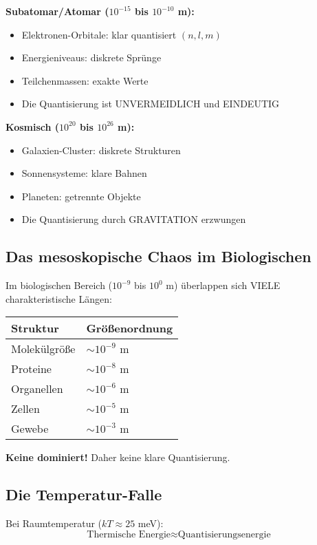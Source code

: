 \documentclass[12pt,a4paper]{article}
\begin{document}
	\textbf{Subatomar/Atomar ($10^{-15}$ bis $10^{-10}$ m):}
	\begin{itemize}
		\item Elektronen-Orbitale: klar quantisiert $(n, l, m)$
		\item Energieniveaus: diskrete Sprünge
		\item Teilchenmassen: exakte Werte
		\item Die Quantisierung ist UNVERMEIDLICH und EINDEUTIG
	\end{itemize}
	
	\textbf{Kosmisch ($10^{20}$ bis $10^{26}$ m):}
	\begin{itemize}
		\item Galaxien-Cluster: diskrete Strukturen
		\item Sonnensysteme: klare Bahnen
		\item Planeten: getrennte Objekte
		\item Die Quantisierung durch GRAVITATION erzwungen
	\end{itemize}
	
	\subsection{Das mesoskopische Chaos im Biologischen}
	
	Im biologischen Bereich ($10^{-9}$ bis $10^0$ m) überlappen sich VIELE charakteristische Längen:
	
	\begin{center}
		\begin{tabular}{ll}
			\toprule
			Struktur & Größenordnung\\
			\midrule
			Molekülgröße & $\sim 10^{-9}$ m\\
			Proteine & $\sim 10^{-8}$ m\\
			Organellen & $\sim 10^{-6}$ m\\
			Zellen & $\sim 10^{-5}$ m\\
			Gewebe & $\sim 10^{-3}$ m\\
			\bottomrule
		\end{tabular}
	\end{center}
	
	\textbf{Keine dominiert!} Daher keine klare Quantisierung.
	
	\subsection{Die Temperatur-Falle}
	
	Bei Raumtemperatur ($kT \approx 25$ meV):
	\begin{equation}
		\text{Thermische Energie} \approx \text{Quantisierungsenergie}
	\end{equation}
	
\end{document}
